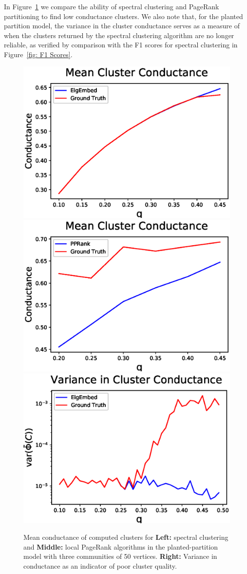\documentclass[11pt]{article}
\begin{document}
In Figure~\ref{fig: Conductance} we compare the ability of spectral clustering and PageRank partitioning to find low conductance clusters. We also note that, for the planted partition model, the variance in the cluster conductance serves as a measure of when the clusters returned by the spectral clustering algorithm are no longer reliable, as verified by comparison with the F1 scores for spectral clustering in Figure~\ref{fig: F1 Scores}.
\begin{figure}
\includegraphics[width=.3\textwidth]{MCond_3b.eps}
\includegraphics[width=.3\textwidth]{Cond_3b_pprank.eps}
\includegraphics[width=.3\textwidth]{Cond_3b.eps}
\caption{Mean conductance of computed clusters for \textbf{Left:} spectral clustering and \textbf{Middle:} local PageRank algorithms in the planted-partition model with three communities of 50 vertices. \textbf{Right:} Variance in conductance as an indicator of poor cluster quality.}\label{fig: Conductance}
\end{figure}
\end{document}
